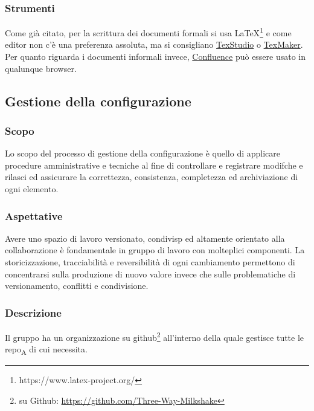     \subsubsection{Strumenti}
    Come già citato, per la scrittura dei documenti formali si usa \LaTeX\footnote{https://www.latex-project.org/} e come editor non c'è una preferenza assoluta, ma si consigliano \href{http://www.texstudio.org/}{TexStudio} o \href{https://www.xm1math.net/texmaker/}{TexMaker}. Per quanto riguarda i documenti informali invece, \href{https://www.atlassian.com/software/confluence}{Confluence} può essere usato in qualunque browser.

\subsection{Gestione della configurazione}
    \subsubsection{Scopo}
        Lo scopo del processo di gestione della configurazione è quello di applicare procedure amministrative e tecniche al fine di controllare e registrare modifche e rilasci ed assicurare la correttezza, consistenza, completezza ed archiviazione di ogni elemento.
    \subsubsection{Aspettative}
        Avere uno spazio di lavoro versionato, condivisp ed altamente orientato alla collaborazione è fondamentale in gruppo di lavoro con molteplici componenti. La storicizzazione, tracciabilità e reversibilità di ogni cambiamento permettono di concentrarsi sulla produzione di nuovo valore invece che sulle problematiche di versionamento, conflitti e condivisione.
    \subsubsection{Descrizione}
        Il gruppo \group ha un organizzazione su github\footnote{\group su Github: \url{https://github.com/Three-Way-Milkshake}} all'interno della quale gestisce tutte le \acrshort{repo}\textsubscript{A} di cui necessita.
